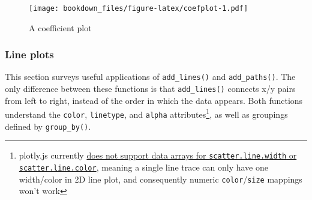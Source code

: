 \documentclass[12pt,]{isuthesis}
\newenvironment{Shaded}{\begin{snugshade}}{\end{snugshade}}
\newcommand{\KeywordTok}[1]{\textcolor[rgb]{0.13,0.29,0.53}{\textbf{{#1}}}}
\newcommand{\DataTypeTok}[1]{\textcolor[rgb]{0.13,0.29,0.53}{{#1}}}
\newcommand{\DecValTok}[1]{\textcolor[rgb]{0.00,0.00,0.81}{{#1}}}
\newcommand{\StringTok}[1]{\textcolor[rgb]{0.31,0.60,0.02}{{#1}}}
\newcommand{\CommentTok}[1]{\textcolor[rgb]{0.56,0.35,0.01}{\textit{{#1}}}}
\newcommand{\NormalTok}[1]{{#1}}
\let\rmarkdownfootnote\footnote%
\def\footnote{\protect\rmarkdownfootnote}
\begin{document}
\begin{Shaded}
\end{Shaded}

\begin{figure}[htbp]
\centering
\texttt{[image: bookdown\_files/figure-latex/coefplot-1.pdf]}
\caption{\label{fig:coefplot}A coefficient plot}
\end{figure}

\hypertarget{line-plots}{\subsubsection{Line plots}\label{line-plots}}

This section surveys useful applications of \texttt{add\_lines()} and
\texttt{add\_paths()}. The only difference between these functions is
that \texttt{add\_lines()} connects x/y pairs from left to right,
instead of the order in which the data appears. Both functions
understand the \texttt{color}, \texttt{linetype}, and \texttt{alpha}
attributes\footnote{plotly.js currently
  \href{https://github.com/plotly/plotly.js/issues/147}{does not support
  data arrays for \texttt{scatter.line.width} or
  \texttt{scatter.line.color}}, meaning a single line trace can only
  have one width/color in 2D line plot, and consequently numeric
  \texttt{color}/\texttt{size} mappings won't work}, as well as
groupings defined by \texttt{group\_by()}.
\end{document}
